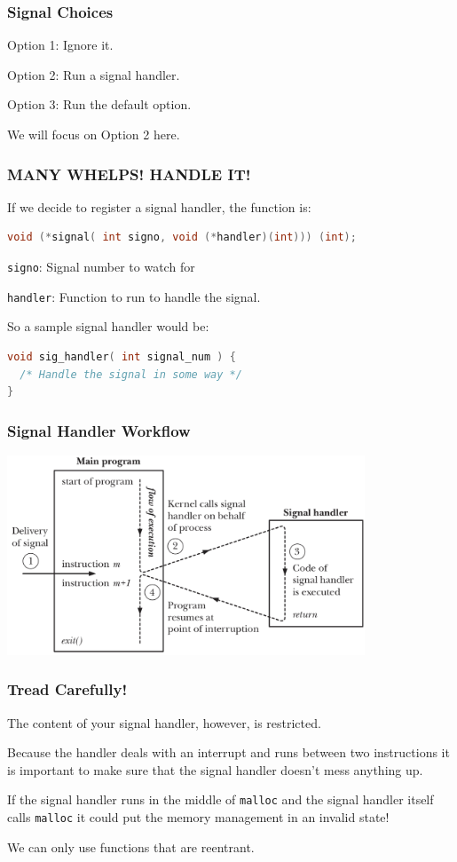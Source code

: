 \begin{frame}
	\frametitle{Signal Choices}

	Option 1: Ignore it.

	Option 2: Run a signal handler.

	Option 3: Run the default option.

	We will focus on Option 2 here.

\end{frame}


\begin{frame}[fragile]
	\frametitle{MANY WHELPS! HANDLE IT!}

	If we decide to register a signal handler, the function is:
	\begin{lstlisting}[language=C]
void (*signal( int signo, void (*handler)(int))) (int);
\end{lstlisting}

	\texttt{signo}: Signal number to watch for

	\texttt{handler}: Function to run to handle the signal.

	So a sample signal handler would be:
	\begin{lstlisting}[language=C]
void sig_handler( int signal_num ) {
  /* Handle the signal in some way */
}
\end{lstlisting}

\end{frame}


\begin{frame}
	\frametitle{Signal Handler Workflow}

	\begin{center}
		\includegraphics[width=0.8\textwidth]{images/sighandler.png}
	\end{center}


\end{frame}


\begin{frame}
	\frametitle{Tread Carefully!}

	The content of your signal handler, however, is restricted.

	Because the handler deals with an interrupt and runs between two instructions it is important to make sure that the signal handler doesn't mess anything up.

	If the signal handler runs in the middle of \texttt{malloc} and the signal handler itself calls \texttt{malloc} it could put the memory management in an invalid state!

	We can only use functions that are \alert{reentrant}.


\end{frame}


